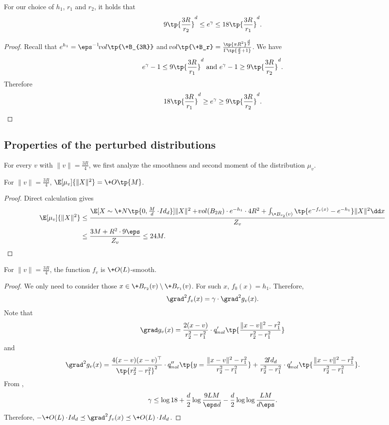 \begin{corollary}\label{cor:gamma-bound}
    For our choice of $h_1$, $r_1$ and $r_2$, it holds that
    \[
        9\tp{\frac{3R}{r_2}}^d \leq e^{\gamma}\leq 18\tp{\frac{3R}{r_1}}^d.
    \]
\end{corollary}
\begin{proof}
    Recall that $e^{h_1}=\eps^{-1}\vol\tp{\+B_{3R}}$ and $\vol\tp{\+B_r} = \frac{\tp{\pi R^2}^{\frac{d}{2}}}{\Gamma\tp{\frac{d}{2}+1}}$. We have
    \[
        e^\gamma-1 \leq  9\tp{\frac{3R}{r_1}}^d \mbox{ and } e^\gamma-1 \geq 9 \tp{\frac{3R}{r_2}}^d.
    \]
    Therefore
    \[
        18\tp{\frac{3R}{r_1}}^d \geq e^\gamma\geq 9 \tp{\frac{3R}{r_2}}^d.
    \]
\end{proof}

\subsection{Properties of the perturbed distributions}
For every $v$ with $\|v\|= \frac{3R}{4}$, we first analyze the smoothness and second moment of the distribution $\mu_v$.

\begin{lemma}\label{lem:moment}
    For $\|v\|=\frac{3R}{4}$, $\E[\mu_v]{\|X\|^2}= \+O\tp{M}$.
\end{lemma}
\begin{proof}
    Direct calculation gives
    \begin{align*}
        \E[\mu_v]{\|X\|^2} & \leq \frac{\E[X\sim \+N\tp{0,\frac{M}{d}\cdot \!{Id}_d}]{\|X\|^2} + \vol (B_{2R})\cdot e^{-h_1}\cdot 4R^2 + \int_{\+B_{r_2}(v)} \tp{e^{-f_v(x)} - e^{-h_1}} \|X\|^2 \dd x}{Z_v} \\
        &\leq \frac{3M + R^2\cdot 9\eps}{Z_v} \leq 24 M.
    \end{align*}
\end{proof}

\begin{lemma}\label{smooth}
  For $\|v\|=\frac{3R}{4}$, the function $f_v$ is $\+O(L)$-smooth. 
\end{lemma}
\begin{proof}
    We only need to consider those $x\in \+B_{r_2}(v)\setminus \+B_{r_1}(v)$. For such $x$, $f_0(x)=h_1$. Therefore,
    \[
        \grad^2 f_v(x) = \gamma\cdot \grad^2 g_v(x).
    \]
    Note that
    \[
        \grad g_v(x) = \frac{2(x-v)}{r_2^2-r_1^2}\cdot q_{\!{mol}}'\tp{\frac{\|x-v\|^2-r_1^2}{r_2^2-r_1^2}}
    \]
    and
    \[
        \grad^2 g_v(x) = \frac{4(x-v)(x-v)^{\top}}{\tp{r_2^2-r_1^2}^2}\cdot q''_{\!{mol}}\tp{y=\frac{\|x-v\|^2-r_1^2}{r_2^2-r_1^2}} + \frac{2\!{Id}_d}{r_2^2-r_1^2}\cdot q'_{\!{mol}}\tp{\frac{\|x-v\|^2-r_1^2}{r_2^2-r_1^2}}.
    \]
    From , 
    \[
        \gamma \leq \log 18 + \frac{d}{2}\log\frac{9LM}{\eps d} - \frac{d}{2}\log\log \frac{LM}{d\eps}.
    \]
    Therefore, $-\+O(L)\cdot\!{Id}_d \preceq \grad^2 f_v(x) \preceq \+O(L)\cdot\!{Id}_d $.
\end{proof}

